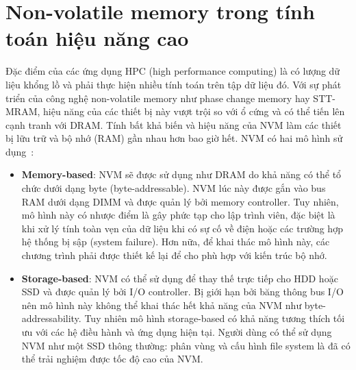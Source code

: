\clearpage
\section{Non-volatile memory trong tính toán hiệu năng cao}




Đặc điểm của các ứng dụng HPC (high performance computing) là có lượng dữ liệu
khổng lồ và phải thực hiện nhiều tính toán trên tập dữ liệu đó. Với sự phát
triển của công nghệ non-volatile memory như phase change memory hay STT-MRAM,
hiệu năng của các thiết bị này vượt trội so với ổ cứng và có thể tiến lên cạnh
tranh với DRAM. Tính bất khả biến và hiệu năng của NVM làm các thiết bị lữu trữ
và bộ nhớ (RAM) gần nhau hơn bao giờ hết. NVM có hai mô hình sử
dụng~\cite{liuPerformanceEvaluationModeling2017}:

\begin{itemize}
    \item \textbf{Memory-based}: NVM sẽ được sử dụng như DRAM do khả năng có thể
    tổ chức dưới dạng byte (byte-addressable). NVM lúc này được gắn vào bus RAM
    dưới dạng DIMM và được quản lý bởi memory controller. Tuy nhiên, mô hình này
    có nhược điểm là gây phức tạp cho lập trình viên, đặc biệt là khi xử lý tính
    toàn vẹn của dữ liệu khi có sự cố về điện hoặc các trường hợp hệ thống bị
    sập (system failure). Hơn nữa, để khai thác mô hình này, các chương trình
    phải được thiết kế lại để cho phù hợp với kiến trúc bộ nhớ.

    \item \textbf{Storage-based}: NVM có thể sử dụng để thay thế trực tiếp cho
    HDD hoặc SSD và được quản lý bởi I/O controller. Bị giới hạn bởi băng thông
    bus I/O nên mô hình này không thể khai thác hết khả năng của NVM như
    byte-addressability. Tuy nhiên mô hình storage-based có khả năng tương thích
    tối ưu với các hệ điều hành và ứng dụng hiện tại. Người dùng có thể sử dụng
    NVM như một SSD thông thường: phân vùng và cấu hình file system là đã có thể
    trải nghiệm được tốc độ cao của NVM.

\end{itemize}

